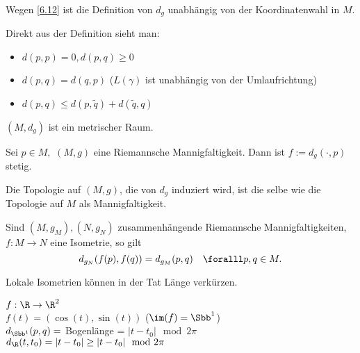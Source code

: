 \begin{rem}\lecture
	Wegen \ref{6.12} ist die Definition von $d_g$ unabhängig von der Koordinatenwahl in $M$.
\end{rem}

\begin{rem}
	Direkt aus der Definition sieht man:
	\begin{itemize}
		\item $ d(p,p) = 0, d(p,q) \geq 0 $
		\item $ d(p,q) = d(q,p) $ ($L(\gamma)$ ist unabhängig von der Umlaufrichtung)
		\item $ d(p,q) \leq d(p,\tilde{q}) + d(\tilde{q},q) $
	\end{itemize}
\end{rem}

\begin{thm}
	$ (M,d_g) $ ist ein metrischer Raum.
\end{thm}

\begin{lem}
	Sei $ p \in M,$ $(M,g) $ eine Riemannsche Mannigfaltigkeit. Dann ist $ f:= d_g(\cdot,p) $ stetig.
\end{lem}

\begin{cor}
	Die Topologie auf $ (M,g) $, die von $d_g$ induziert wird, ist die selbe wie die Topologie auf $M$ als Mannigfaltigkeit.
\end{cor}

\begin{lem}
	Sind $ (M,g_M), (N,g_N) $ zusammenhängende Riemannsche Mannigfaltigkeiten, $ f:M \to N $ eine Isometrie, so gilt
	\[ d_{g_N}(f(p),f(q)) = d_{g_M}(p,q) \quad \foralll p,q \in M. \]
\end{lem}

\begin{rem*}
	Lokale Isometrien können in der Tat Länge verkürzen.\\
	\begin{minipage}{\linewidth}
		\begin{wrapfigure}{r}{4cm}
		\end{wrapfigure}
		$ f: \R \to \R^2$\\
		$f(t) = (\cos(t),\sin(t)) $ ($ \im(f) = \Sbb^1 $)\\
		$ d_{\Sbb^1}(p,q) = $ Bogenlänge = $ |t-t_0| \mod 2\pi $\\
		$ d_\R(t,t_0) = |t-t_0| \geq |t-t_0| \mod 2\pi $
	\end{minipage}
\end{rem*}


